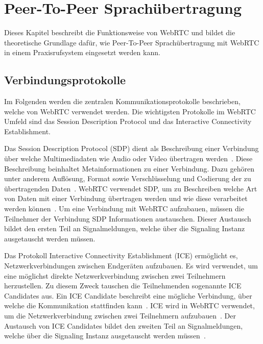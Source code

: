 \section{Peer-To-Peer Sprachübertragung}

Dieses Kapitel beschreibt die Funktionsweise von WebRTC und bildet die theoretische Grundlage dafür, wie Peer-To-Peer Sprachübertragung mit WebRTC in einem Praxisrufsystem eingesetzt werden kann.

\subsection{Verbindungsprotokolle}

Im Folgenden werden die zentralen Kommunikationsprotokolle beschrieben, welche von WebRTC verwendet werden.
Die wichtigsten Protokolle im WebRTC Umfeld sind das Session Description Protocol und das Interactive Connectivity Establishment.

Das Session Description Protocol (SDP) dient als Beschreibung einer Verbindung über welche Multimediadaten wie Audio oder Video übertragen werden~\cite{rfc_4566_sdp}.
Diese Beschreibung beinhaltet Metainformationen zu einer Verbindung.
Dazu gehören unter anderem Auflösung, Format sowie Verschlüsselung und Codierung der zu übertragenden Daten~\cite{mozilla_webRTC_protocols}.
WebRTC verwendet SDP, um zu Beschreiben welche Art von Daten mit einer Verbindung übertragen werden und wie diese verarbeitet werden können~\cite{webrtc_spec}.
Um eine Verbindung mit WebRTC aufzubauen, müssen die Teilnehmer der Verbindung SDP Informationen austauschen.
Dieser Austausch bildet den ersten Teil an Signalmeldungen, welche über die Signaling Instanz ausgetauscht werden müssen.

Das Protokoll Interactive Connectivity Establishment (ICE) ermöglicht es, Netzwerkverbindungen zwischen Endgeräten aufzubauen.
Es wird verwendet, um eine möglichst direkte Netzwerkverbindung zwischen zwei Teilnehmern herzustellen.
Zu diesem Zweck tauschen die Teilnehmenden sogenannte ICE Candidates aus.
Ein ICE Candidate beschreibt eine mögliche Verbindung, über welche die Kommunikation stattfinden kann~\cite{rfc_8445_ice}.
ICE wird in WebRTC verwendet, um die Netzwerkverbindung zwischen zwei Teilnehmern aufzubauen~\cite{mozilla_webRTC_protocols}.
Der Austausch von ICE Candidates bildet den zweiten Teil an Signalmeldungen, welche über die Signaling Instanz ausgetauscht werden müssen~\cite{webrtc_spec}.

